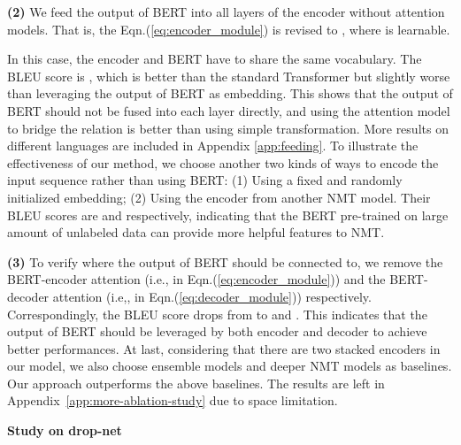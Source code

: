 \documentclass{article} \usepackage{iclr2020_conference,times}
\newcommand{\myeqref}[1]{Eqn.(\ref{#1})}
\begin{document}
\noindent\textbf{(2)} We feed the output of BERT into all layers of the encoder without attention models. That is, the \myeqref{eq:encoder_module} is revised to , where  is learnable.
\iffalse
\begin{small}

\end{small}
\fi
In this case, the encoder and BERT have to share the same vocabulary. The BLEU score is , which is better than the standard Transformer but slightly worse than leveraging the output of BERT as embedding. This shows that the output of BERT should not be fused into each layer directly, and using the attention model to bridge the relation is better than using simple transformation. More results on different languages are included in Appendix \ref{app:feeding}.
To illustrate the effectiveness of our method, we choose another two kinds of ways to encode the input sequence rather than using BERT: (1) Using a fixed and randomly initialized embedding; (2) Using the encoder from another NMT model. Their BLEU scores are  and  respectively, indicating that the BERT pre-trained on large amount of unlabeled data can provide more helpful features to NMT.


\noindent\textbf{(3)} To verify where the output of BERT should be connected to, we remove the BERT-encoder attention (i.e.,  in \myeqref{eq:encoder_module}) and the BERT-decoder attention (i.e,,  in \myeqref{eq:decoder_module}) respectively. Correspondingly, the BLEU score drops from  to  and . This indicates that the output of BERT should be leveraged by both encoder and decoder to achieve better performances.
At last, considering that there are two stacked encoders in our model, we also choose ensemble models and deeper NMT models as baselines. Our approach outperforms the above baselines. The results are left in Appendix~\ref{app:more-ablation-study} due to space limitation.

\noindent\textbf{Study on drop-net}
\end{document}

